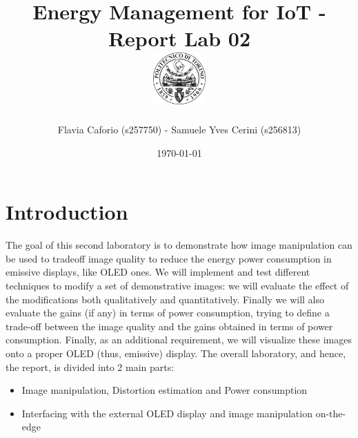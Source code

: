 \documentclass[a4paper]{article}
\begin{document}
    \title{
        Energy Management for IoT - Report Lab 02 \\[0.5cm]
        \includegraphics[width=0.15\textwidth]{PoliLogo.png}%
    }
    \author{Flavia Caforio (s257750) - Samuele Yves Cerini (s256813)}
    \date{\today}
    \maketitle

    \tableofcontents

%
\section{Introduction}
    The goal of this second laboratory is to demonstrate how image manipulation can be used to tradeoff image quality to reduce the energy power consumption in emissive displays, like OLED ones. We will implement and test different techniques to modify a set of demonstrative images: we will evaluate the effect of the modifications both qualitatively and quantitatively. Finally we will also evaluate the gains (if any) in terms of power consumption, trying to define a trade-off between the image quality and the gains obtained in terms of power consumption. Finally, as an additional requirement, we will visualize these images onto a proper OLED (thus, emissive) display.
    The overall laboratory, and hence, the report, is divided into 2 main parts:
    \begin{itemize}
        \item Image manipulation, Distortion estimation and Power consumption
        \item Interfacing with the external OLED display and image manipulation on-the-edge
    \end{itemize}
\end{document}
